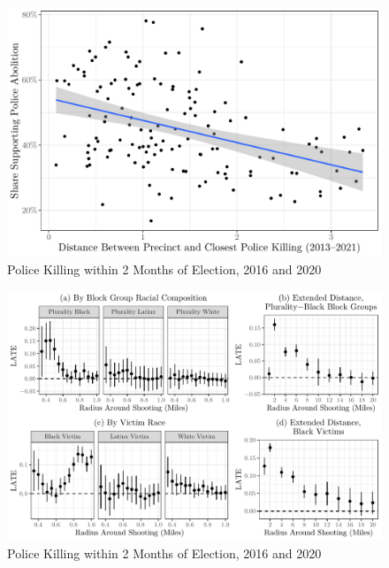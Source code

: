 \documentclass[
  12pt,
]{article}
\begin{document}
\begin{figure}[h]

{\centering \includegraphics{shoot_to_files/figure-latex/minn-scatter-1} 

}

\caption{\label{fig:map}Police Killing within 2 Months of Election, 2016 and 2020}\label{fig:minn-scatter}
\end{figure}

\begin{figure}[h]

{\centering \includegraphics{shoot_to_files/figure-latex/paneled-race-effects-1} 

}

\caption{\label{fig:map}Police Killing within 2 Months of Election, 2016 and 2020}\label{fig:paneled-race-effects}
\end{figure}
\end{document}
